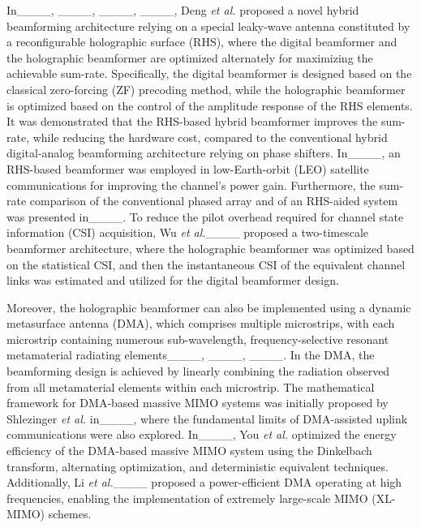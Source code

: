 In____, ____, ____, ____, Deng \textit{et al.} proposed a novel hybrid beamforming architecture relying on a special leaky-wave antenna constituted by a reconfigurable holographic surface (RHS), where the digital beamformer and the holographic beamformer are optimized alternately for maximizing the achievable sum-rate. Specifically, the digital beamformer is designed based on the classical zero-forcing (ZF) precoding method, while the holographic beamformer is optimized based on the control of the amplitude response of the RHS elements. It was demonstrated that the RHS-based hybrid beamformer improves the sum-rate, while reducing the hardware cost, compared to the conventional hybrid digital-analog beamforming architecture relying on phase shifters. In____, an RHS-based beamformer was employed in low-Earth-orbit (LEO) satellite communications for improving the channel's power gain. Furthermore, the sum-rate comparison of the conventional phased array and of an RHS-aided system was presented in____. To reduce the pilot overhead required for channel state information (CSI) acquisition, Wu \textit{et al.}____ proposed a two-timescale beamformer architecture, where the holographic beamformer was optimized based on the statistical CSI, and then the instantaneous CSI of the equivalent channel links was estimated and utilized for the digital beamformer design.

Moreover, the holographic beamformer can also be implemented using a dynamic metasurface antenna (DMA), which comprises multiple microstrips, with each microstrip containing numerous sub-wavelength, frequency-selective resonant metamaterial radiating elements____, ____, ____. In the DMA, the beamforming design is achieved by linearly combining the radiation observed from all metamaterial elements within each microstrip. The mathematical framework for DMA-based massive MIMO systems was initially proposed by Shlezinger \textit{et al.} in____, where the fundamental limits of DMA-assisted uplink communications were also explored. In____, You \textit{et al.} optimized the energy efficiency of the DMA-based massive MIMO system using the Dinkelbach transform, alternating optimization, and deterministic equivalent techniques. Additionally, Li \textit{et al.}____ proposed a power-efficient DMA operating at high frequencies, enabling the implementation of extremely large-scale MIMO (XL-MIMO) schemes.

